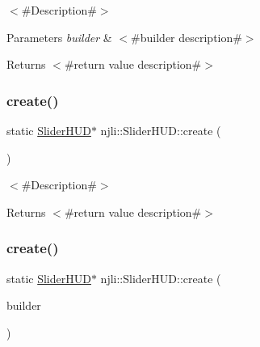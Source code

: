 $<$\#\+Description\#$>$


\begin{DoxyParams}{Parameters}
{\em builder} & $<$\#builder description\#$>$\\
\hline
\end{DoxyParams}
\begin{DoxyReturn}{Returns}
$<$\#return value description\#$>$ 
\end{DoxyReturn}
\mbox{\label{classnjli_1_1_slider_h_u_d_a39e75f82c8e15b733dd034f94d33927c}} 
\subsubsection{\texorpdfstring{create()}{create()}\hspace{0.1cm}{\footnotesize\ttfamily [2/3]}}
{\footnotesize\ttfamily static \mbox{\hyperlink{classnjli_1_1_slider_h_u_d}{Slider\+H\+UD}}$\ast$ njli\+::\+Slider\+H\+U\+D\+::create (\begin{DoxyParamCaption}{ }\end{DoxyParamCaption})\hspace{0.3cm}{\ttfamily [static]}}

$<$\#\+Description\#$>$

\begin{DoxyReturn}{Returns}
$<$\#return value description\#$>$ 
\end{DoxyReturn}
\mbox{\label{classnjli_1_1_slider_h_u_d_ad82c56035c83ac61772fd56872575136}} 
\subsubsection{\texorpdfstring{create()}{create()}\hspace{0.1cm}{\footnotesize\ttfamily [3/3]}}
{\footnotesize\ttfamily static \mbox{\hyperlink{classnjli_1_1_slider_h_u_d}{Slider\+H\+UD}}$\ast$ njli\+::\+Slider\+H\+U\+D\+::create (\begin{DoxyParamCaption}\item[{const \mbox{\hyperlink{classnjli_1_1_slider_h_u_d_builder}{Slider\+H\+U\+D\+Builder}} \&}]{builder }\end{DoxyParamCaption})\hspace{0.3cm}{\ttfamily [static]}}

